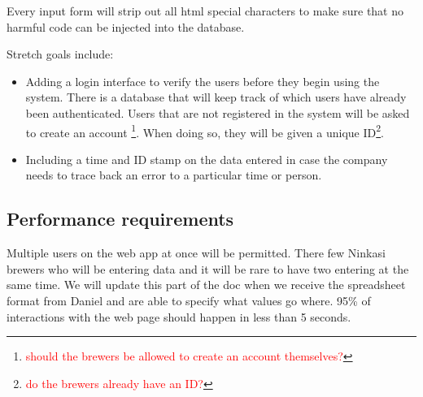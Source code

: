 \documentclass[draftclsnofoot,onecolumn,letterpaper,10pt,compsoc]{IEEEtran}
\newcommand\question[1]{\footnote{\textcolor{red}{#1}}}
\begin{document}
		Every input form will strip out all html special characters to make sure that no harmful code can be injected into the database.

		Stretch goals include:
		\begin{itemize}
			\item{Adding a login interface to verify the users before they begin using the system.
			There is a database that will keep track of which users have already been authenticated.
			Users that are not registered in the system will be asked to create an account \question{should the brewers be allowed to create an account themselves?}.
			When doing so, they will be given a unique ID\question{do the brewers already have an ID?}.}

			\item{Including a time and ID stamp on the data entered in case the company needs to trace back an error to a particular time or person.}
		\end{itemize}

	\subsection{Performance requirements}
		Multiple users on the web app at once will be permitted.
		There few Ninkasi brewers who will be entering data and it will be rare to have two entering at the same time.
		We will update this part of the doc when we receive the spreadsheet format from Daniel and are able to specify what values go where.
		95\% of interactions with the web page should happen in less than 5 seconds.
\end{document}
